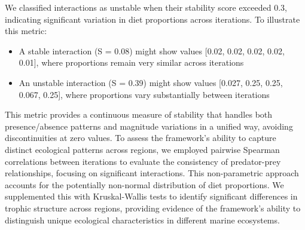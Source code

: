 We classified interactions as unstable when their stability score exceeded 0.3, indicating significant variation in diet proportions across iterations. To illustrate this metric:

\begin{itemize}
    \item A stable interaction (S = 0.08) might show values [0.02, 0.02, 0.02, 0.02, 0.01], where proportions remain very similar across iterations
    \item An unstable interaction (S = 0.39) might show values [0.027, 0.25, 0.25, 0.067, 0.25], where proportions vary substantially between iterations
\end{itemize}

This metric provides a continuous measure of stability that handles both presence/absence patterns and magnitude variations in a unified way, avoiding discontinuities at zero values. To assess the framework's ability to capture distinct ecological patterns across regions, we employed pairwise Spearman correlations between iterations to evaluate the consistency of predator-prey relationships, focusing on significant interactions. This non-parametric approach accounts for the potentially non-normal distribution of diet proportions. We supplemented this with Kruskal-Wallis tests to identify significant differences in trophic structure across regions, providing evidence of the framework's ability to distinguish unique ecological characteristics in different marine ecosystems.


